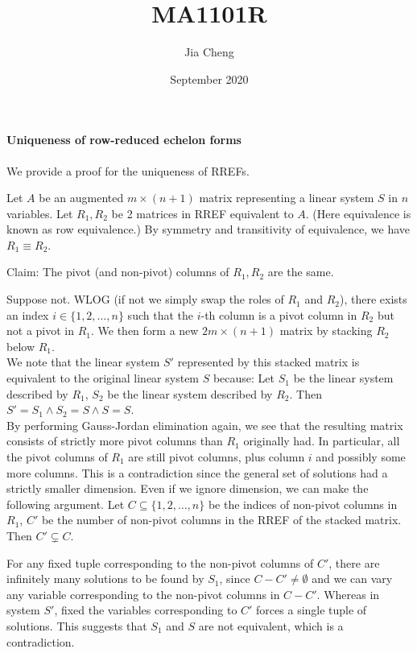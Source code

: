 \documentclass{article}
\title{MA1101R}
\author{Jia Cheng}
\date{September 2020}
\begin{document}
\maketitle

\paragraph{Uniqueness of row-reduced echelon forms} We provide a proof for the uniqueness of RREFs.

Let $A$ be an augmented $m\times (n+1)$ matrix representing a linear system $S$ in $n$ variables. Let $R_1, R_2$ be 2 matrices in RREF equivalent to $A$. (Here equivalence is known as row equivalence.) By symmetry and transitivity of equivalence, we have $R_1\equiv R_2$.

Claim: The pivot (and non-pivot) columns of $R_1, R_2$ are the same.

Suppose not. WLOG (if not we simply swap the roles of $R_1$ and $R_2$), there exists an index $i\in \{1,2,\dots, n\}$ such that the $i$-th column is a pivot column in $R_2$ but not a pivot in $R_1$. We then form a new $2m\times (n+1)$ matrix by stacking $R_2$ below $R_1$. \\
We note that the linear system $S'$ represented by this stacked matrix is equivalent to the original linear system $S$ because: Let $S_1$ be the linear system described by $R_1$, $S_2$ be the linear system described by $R_2$. Then $S' = S_1\land S_2 = S\land S = S$.\\
By performing Gauss-Jordan elimination again, we see that the resulting matrix consists of strictly more pivot columns than $R_1$ originally had. In particular, all the pivot columns of $R_1$ are still pivot columns, plus column $i$ and possibly some more columns. This is a contradiction since the general set of solutions had a strictly smaller dimension. Even if we ignore dimension, we can make the following argument. Let $C\subseteq \{1,2,\dots,n\}$ be the indices of non-pivot columns in $R_1$, $C'$ be the  number of non-pivot columns in the RREF of the stacked matrix. Then $C'\subsetneq C$.

For any fixed tuple corresponding to the non-pivot columns of $C'$, there are infinitely many solutions to be found by $S_1$, since $C-C'\neq \emptyset$ and we can vary any variable corresponding to the non-pivot columns in $C-C'$. Whereas in system $S'$, fixed the variables corresponding to $C'$ forces a single tuple of solutions. This suggests that $S_1$ and $S$ are not equivalent, which is a contradiction.
\end{document}
